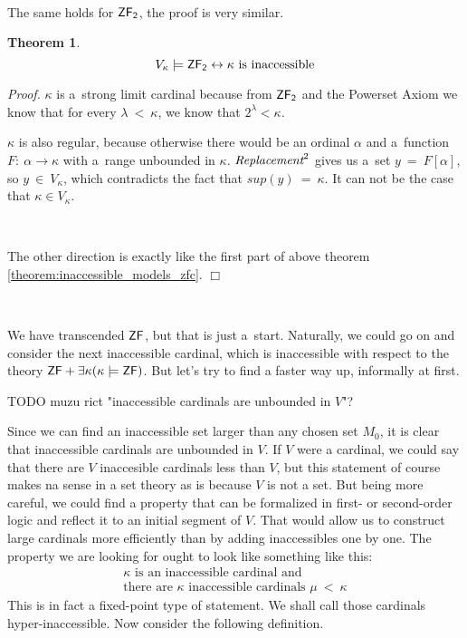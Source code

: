 \documentclass[12pt,a4paper]{article}
\newtheorem{theorem}{Theorem}[section]
\newenvironment{proof}
{\noindent \textit{Proof.}}
{\hspace*{\fill} $\Box$}
\renewcommand{\iff}{\leftrightarrow}
\newcommand{\then}{\rightarrow}
\begin{document}
\

The same holds for $\sf{ZF}_2$, the proof is very similar.
\begin{theorem}\label{theorem:inaccessible_models_zfc_2}
\begin{equation}
V_\kappa \models \sf{ZF}_2 \iff \mbox{$\kappa$ is inaccessible}
\end{equation}
\end{theorem}
\begin{proof}
$\kappa$ is a~strong limit cardinal because from $\sf{ZF}_2$ and the Powerset Axiom we know that for every $\lambda\ <\ \kappa$, we know that $2^{\lambda} < \kappa$.

$\kappa$ is also regular, because otherwise there would be an ordinal $\alpha$ and a~function $F:\ \alpha \then \kappa$ with a~range unbounded in $\kappa$. 
$\emph{Replacement}^2$ gives us a~set $y\ =\ F[\alpha]$, so $y\ \in\ V_\kappa$, which contradicts the fact that $sup(y)\ =\ \kappa$. It can not be the case that $\kappa \in V_\kappa$.

\

The other direction is exactly like the first part of above theorem \ref{theorem:inaccessible_models_zfc}.
\end{proof}

\



We have transcended $\sf{ZF}$, but that is just a~start. Naturally, we could go on and consider the next inaccessible cardinal, which is inaccessible with respect to the theory $\sf{ZF} + \exists \kappa (\kappa \models \sf{ZF})$. But let's try to find a faster way up, informally at first. 

TODO muzu rict "inaccessible cardinals are unbounded in $V$"?

Since we can find an inaccessible set larger than any chosen set $M_0$, it is clear that inaccessible cardinals are unbounded in $V$. If $V$ were a cardinal, we could say that there are $V$ inaccesible cardinals less than $V$, but this statement of course makes na sense in a set theory as is because $V$ is not a set. But being more careful, we could find a property that can be formalized in first- or second-order logic and reflect it to an initial segment of $V$. That would allow us to construct large cardinals more efficiently than by adding inaccessibles one by one. The property we are looking for ought to look like something like this:
\begin{equation}
\begin{split}
\kappa \mbox{ is an inaccessible cardinal and}\\
\mbox{there are }\kappa\mbox{ inaccessible cardinals }\mu\ <\ \kappa
\end{split}
\end{equation}
This is in fact a fixed-point type of statement. We shall call those cardinals hyper-inaccessible. Now consider the following definition.
\end{document}
